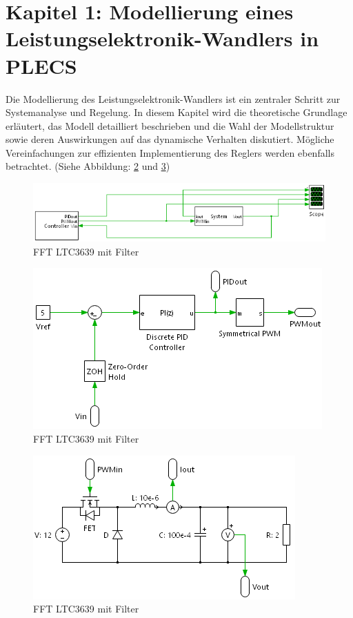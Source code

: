 \section{Kapitel 1: Modellierung eines Leistungselektronik-Wandlers in PLECS} \label{sec:Task1}

Die Modellierung des Leistungselektronik-Wandlers ist ein zentraler Schritt zur Systemanalyse und Regelung. In diesem Kapitel wird die theoretische Grundlage erläutert, das Modell detailliert beschrieben und die Wahl der Modellstruktur sowie deren Auswirkungen auf das dynamische Verhalten diskutiert. Mögliche Vereinfachungen zur effizienten Implementierung des Reglers werden ebenfalls betrachtet. (Siehe Abbildung: \ref{fig:ControllerSoft} und \ref{fig:SystemSoft})

\begin{figure}[H]
    \centering
    \includegraphics[width=0.8\linewidth]{Figure/Soft.png}
    \caption{FFT LTC3639 mit Filter}
    \label{fig:Soft}
\end{figure}

\begin{figure}[H]
    \centering
    \includegraphics[width=0.8\linewidth]{Figure/ControllerSoft.png}
    \caption{FFT LTC3639 mit Filter}
    \label{fig:ControllerSoft}
\end{figure}

\begin{figure}[H]
    \centering
    \includegraphics[width=0.8\linewidth]{Figure/SystemSoft.png}
    \caption{FFT LTC3639 mit Filter}
    \label{fig:SystemSoft}
\end{figure}

